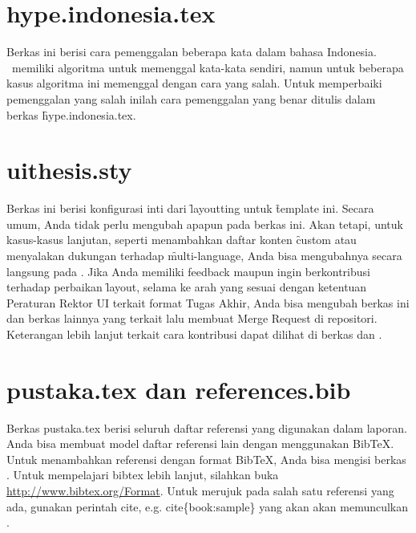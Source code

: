 \section{hype.indonesia.tex}
\label{sec:hype-indonesia-tex}
Berkas ini berisi cara pemenggalan beberapa kata dalam bahasa Indonesia.
\latex~memiliki algoritma untuk memenggal kata-kata sendiri, namun untuk beberapa kasus algoritma ini memenggal dengan cara yang salah.
Untuk memperbaiki pemenggalan yang salah inilah cara pemenggalan yang benar ditulis dalam berkas \f{hype.indonesia.tex}.


\section{uithesis.sty}
\label{sec:uithesis.sty}
Berkas ini berisi konfigurasi inti dari \f{layoutting} untuk \f{template} ini.
Secara umum, Anda tidak perlu mengubah apapun pada berkas ini.
Akan tetapi, untuk kasus-kasus lanjutan, seperti menambahkan daftar konten \f{custom} atau menyalakan dukungan terhadap \f{multi-language}, Anda bisa mengubahnya secara langsung pada .
Jika Anda memiliki feedback maupun ingin berkontribusi terhadap perbaikan \f{layout}, selama ke arah yang sesuai dengan ketentuan Peraturan Rektor UI terkait format Tugas Akhir, Anda bisa mengubah berkas ini dan berkas lainnya yang terkait lalu membuat Merge Request di repositori.
Keterangan lebih lanjut terkait cara kontribusi dapat dilihat di berkas  dan .


\section{pustaka.tex dan references.bib}
\label{sec:pustaka-tex}
Berkas pustaka.tex berisi seluruh daftar referensi yang digunakan dalam
laporan.
Anda bisa membuat model daftar referensi lain dengan menggunakan BibTeX. Untuk menambahkan referensi dengan format BibTeX, Anda bisa mengisi berkas .
Untuk mempelajari bibtex lebih lanjut, silahkan buka \url{http://www.bibtex.org/Format}.
Untuk merujuk pada salah satu referensi yang ada, gunakan perintah \bslash cite, e.g. \bslash cite\{book:sample\} yang akan akan memunculkan \cite{book:sample}.


